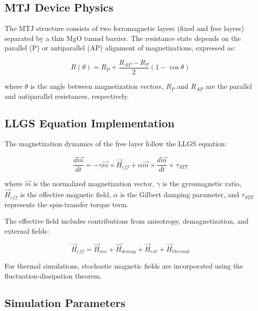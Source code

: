 \documentclass[conference]{IEEEtran}
\begin{document}
\subsection{MTJ Device Physics}

The MTJ structure consists of two ferromagnetic layers (fixed and free layers) separated by a thin MgO tunnel barrier. The resistance state depends on the parallel (P) or antiparallel (AP) alignment of magnetizations, expressed as:

\begin{equation}
R(\theta) = R_P + \frac{R_{AP} - R_P}{2}(1 - \cos\theta)
\label{eq:resistance}
\end{equation}

where $\theta$ is the angle between magnetization vectors, $R_P$ and $R_{AP}$ are the parallel and antiparallel resistances, respectively.

\subsection{LLGS Equation Implementation}

The magnetization dynamics of the free layer follow the LLGS equation:

\begin{equation}
\frac{d\vec{m}}{dt} = -\gamma \vec{m} \times \vec{H}_{eff} + \alpha \vec{m} \times \frac{d\vec{m}}{dt} + \tau_{STT}
\label{eq:llgs}
\end{equation}

where $\vec{m}$ is the normalized magnetization vector, $\gamma$ is the gyromagnetic ratio, $\vec{H}_{eff}$ is the effective magnetic field, $\alpha$ is the Gilbert damping parameter, and $\tau_{STT}$ represents the spin-transfer torque term.

The effective field includes contributions from anisotropy, demagnetization, and external fields:

\begin{equation}
\vec{H}_{eff} = \vec{H}_{ani} + \vec{H}_{demag} + \vec{H}_{ext} + \vec{H}_{thermal}
\label{eq:heff}
\end{equation}

For thermal simulations, stochastic magnetic fields are incorporated using the fluctuation-dissipation theorem.

\subsection{Simulation Parameters}
\end{document}

